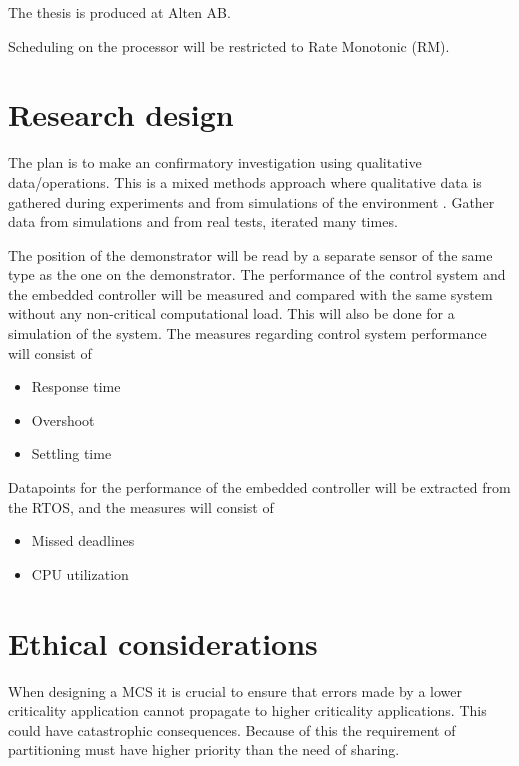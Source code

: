 The thesis is produced at Alten AB. %


Scheduling on the processor will be restricted to Rate Monotonic (RM).

\section{Research design}
\label{sec:research}
The plan is to make an confirmatory investigation using qualitative data/operations. This is a mixed methods approach where qualitative data is gathered during experiments and from simulations of the environment \cite{creswell}. Gather data from simulations and from real tests, iterated many times.

The position of the demonstrator will be read by a separate sensor of the same type as the one on the demonstrator. The performance of the control system and the embedded controller will be measured and compared with the same system without any non-critical computational load. This will also be done for a simulation of the system. The measures regarding control system performance will consist of 
\begin{itemize}
\item Response time
\item Overshoot
\item Settling time %
\end{itemize}

Datapoints for the performance of the embedded controller will be extracted from the RTOS, and the measures will consist of
\begin{itemize}
\item Missed deadlines
\item CPU utilization
\end{itemize}

\section{Ethical considerations}
When designing a MCS it is crucial to ensure that errors made by a lower criticality application cannot propagate to higher criticality applications. This could have catastrophic consequences. Because of this the requirement of partitioning must have higher priority than the need of sharing.
